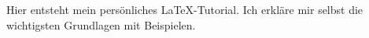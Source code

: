 %
%


Hier entsteht mein persönliches \LaTeX-Tutorial.  
Ich erkläre mir selbst die wichtigsten Grundlagen mit Beispielen.

